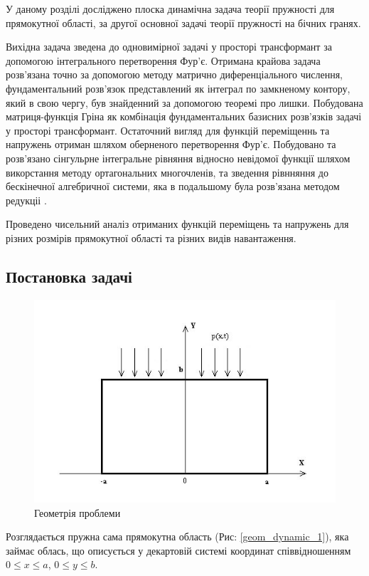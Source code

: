 У даному розділі досліджено плоска динамічна задача теорії пружності для прямокутної області,
за другої основної задачі теорії пружності на бічних гранях.

Вихідна задача зведена до одновимірної задачі у просторі трансформант за допомогою інтегрального перетворення Фур'є.
Отримана крайова задача розв'язана точно за допомогою методу матрично диференціального числення,
фундаментальний розв'язок представлений як інтеграл по замкненому контору, який в свою чергу, був знайденний за допомогою теоремі про лишки.
Побудована матриця-функція Гріна як комбінація фундаментальних базисних розв'язків задачі у просторі трансформант.
Остаточний вигляд для функцій переміщеннь та напружень отриман шляхом оберненого перетворення Фур'є.
Побудовано та розв'язано сінгульрне інтегральне рівняння відносно невідомої функції шляхом викорстання методу ортагональних многочленів, та зведення рівнняння до бескінечної алгебричної системи,
яка в подальшому була розв'язана методом редукціі \cite{popov_3}.

Проведено чисельний аналіз отриманих функцій переміщень та напружень для різних розмірів прямокутної області та різних видів навантаження.

\subsection{Постановка задачі}
\begin{figure}[h]
    \begin{center}
        \includegraphics[scale=1]{images/geometry/image_2.jpg}
    \end{center}
    \caption{Геометрія проблеми}\label{geom_dynamic_2}
\end{figure}
Розглядається пружна сама прямокутна область (Рис: \ref{geom_dynamic_1}), яка займає облась,
що описується у декартовій системі координат співвідношенням $0 \le x \le a$, $0 \le y \le b$.

